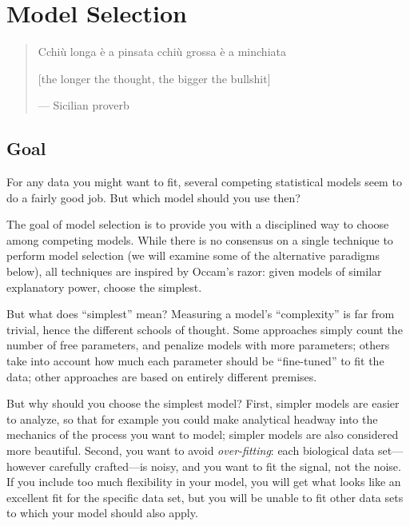 \documentclass[
  letterpaper,
  DIV=11,
  numbers=noendperiod]{scrreprt}
\begin{document}

\hypertarget{model-selection}{%
\chapter{Model Selection}\label{model-selection}}

\begin{quote}
Cchiù longa è a pinsata cchiù grossa è a minchiata

{[}the longer the thought, the bigger the bullshit{]}

--- Sicilian proverb
\end{quote}

\hypertarget{goal-3}{%
\section{Goal}\label{goal-3}}

For any data you might want to fit, several competing statistical models
seem to do a fairly good job. But which model should you use then?

The goal of model selection is to provide you with a disciplined way to
choose among competing models. While there is no consensus on a single
technique to perform model selection (we will examine some of the
alternative paradigms below), all techniques are inspired by Occam's
razor: given models of similar explanatory power, choose the simplest.

But what does ``simplest'' mean? Measuring a model's ``complexity'' is
far from trivial, hence the different schools of thought. Some
approaches simply count the number of free parameters, and penalize
models with more parameters; others take into account how much each
parameter should be ``fine-tuned'' to fit the data; other approaches are
based on entirely different premises.

But why should you choose the simplest model? First, simpler models are
easier to analyze, so that for example you could make analytical headway
into the mechanics of the process you want to model; simpler models are
also considered more beautiful. Second, you want to avoid
\emph{over-fitting}: each biological data set---however carefully
crafted---is noisy, and you want to fit the signal, not the noise. If
you include too much flexibility in your model, you will get what looks
like an excellent fit for the specific data set, but you will be unable
to fit other data sets to which your model should also apply.
\end{document}

